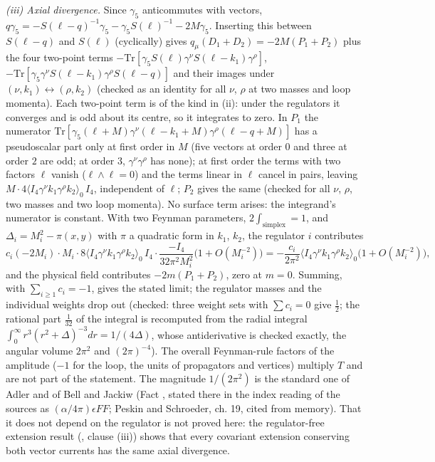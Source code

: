 \emph{(iii) Axial divergence.} Since $\gamma_{5}$ anticommutes with vectors, $q\gamma_{5} = -S(\ell - q)^{-1}\gamma_{5} - \gamma_{5}S(\ell)^{-1} - 2M\gamma_{5}$. Inserting this between $S(\ell - q)$ and $S(\ell)$ (cyclically) gives $q_{\mu}(D_{1} + D_{2}) = -2M(P_{1} + P_{2})$ plus the four two-point terms $-\mathrm{Tr}[\gamma_{5}S(\ell)\gamma^{\nu}S(\ell - k_{1})\gamma^{\rho}]$, $-\mathrm{Tr}[\gamma_{5}\gamma^{\nu}S(\ell - k_{1})\gamma^{\rho}S(\ell - q)]$ and their images under $(\nu, k_{1}) \leftrightarrow (\rho, k_{2})$ (checked as an identity for all $\nu$, $\rho$ at two masses and loop momenta). Each two-point term is of the kind in (ii): under the regulators it converges and is odd about its centre, so it integrates to zero. In $P_{1}$ the numerator $\mathrm{Tr}[\gamma_{5}(\ell + M)\gamma^{\nu}(\ell - k_{1} + M)\gamma^{\rho}(\ell - q + M)]$ has a pseudoscalar part only at first order in $M$ (five vectors at order $0$ and three at order $2$ are odd; at order $3$, $\gamma^{\nu}\gamma^{\rho}$ has none); at first order the terms with two factors $\ell$ vanish ($\ell\wedge\ell = 0$) and the terms linear in $\ell$ cancel in pairs, leaving $M\cdot 4\langle I_{4}\gamma^{\nu}k_{1}\gamma^{\rho}k_{2}\rangle_{0}\,I_{4}$, independent of $\ell$; $P_{2}$ gives the same (checked for all $\nu$, $\rho$, two masses and two loop momenta). No surface term arises: the integrand's numerator is constant. With two Feynman parameters, $2\int_{\mathrm{simplex}} = 1$, and $\Delta_{i} = M_{i}^{2} - \pi(x, y)$ with $\pi$ a quadratic form in $k_{1}$, $k_{2}$, the regulator $i$ contributes
\[
c_{i}(-2M_{i})\cdot M_{i}\cdot 8\langle I_{4}\gamma^{\nu}k_{1}\gamma^{\rho}k_{2}\rangle_{0}\,I_{4}\cdot\frac{-I_{4}}{32\pi^{2}M_{i}^{2}}\bigl(1 + O(M_{i}^{-2})\bigr) = -\frac{c_{i}}{2\pi^{2}}\langle I_{4}\gamma^{\nu}k_{1}\gamma^{\rho}k_{2}\rangle_{0}\bigl(1 + O(M_{i}^{-2})\bigr),
\]
and the physical field contributes $-2m(P_{1} + P_{2})$, zero at $m = 0$. Summing, with $\sum_{i \geq 1}c_{i} = -1$, gives the stated limit; the regulator masses and the individual weights drop out (checked: three weight sets with $\sum c_{i} = 0$ give $\tfrac12$; the rational part $\tfrac{1}{32}$ of the integral is recomputed from the radial integral $\int_{0}^{\infty}r^{3}(r^{2} + \Delta)^{-3}dr = 1/(4\Delta)$, whose antiderivative is checked exactly, the angular volume $2\pi^{2}$ and $(2\pi)^{-4}$). The overall Feynman-rule factors of the amplitude ($-1$ for the loop, the units of propagators and vertices) multiply $T$ and are not part of the statement. The magnitude $1/(2\pi^{2})$ is the standard one of Adler and of Bell and Jackiw (Fact , stated there in the index reading of the sources as $(\alpha/4\pi)\epsilon FF$; Peskin and Schroeder, ch. 19, cited from memory). That it does not depend on the regulator is not proved here: the regulator-free extension result (, clause (iii)) shows that every covariant extension conserving both vector currents has the same axial divergence.

